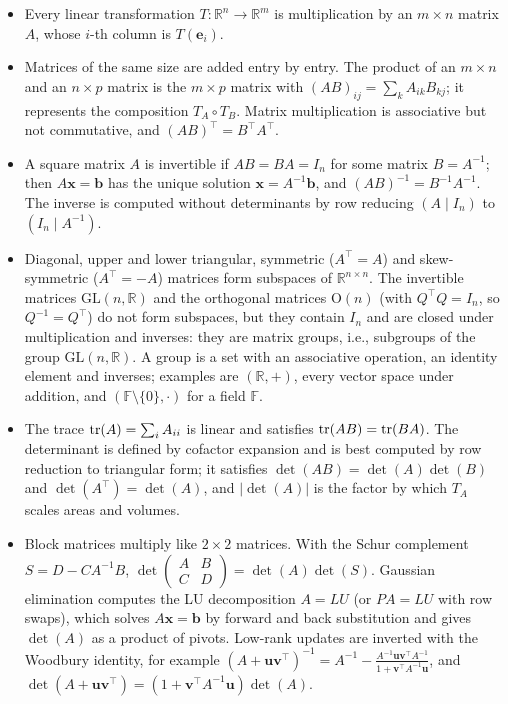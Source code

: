 \begin{itemize}[leftmargin=*]
	\item Every linear transformation $T: \mathbb{R}^n \to \mathbb{R}^m$ is multiplication by an $m \times n$ matrix $A$, whose $i$-th column is $T(\mathbf{e}_i)$.
	\item Matrices of the same size are added entry by entry. The product of an $m \times n$ and an $n \times p$ matrix is the $m \times p$ matrix with $(AB)_{ij} = \sum_k A_{ik} B_{kj}$; it represents the composition $T_A \circ T_B$. Matrix multiplication is associative but not commutative, and $(AB)^\top = B^\top A^\top$.
	\item A square matrix $A$ is invertible if $AB = BA = I_n$ for some matrix $B = A^{-1}$; then $A\mathbf{x} = \mathbf{b}$ has the unique solution $\mathbf{x} = A^{-1}\mathbf{b}$, and $(AB)^{-1} = B^{-1}A^{-1}$. The inverse is computed without determinants by row reducing $(A \mid I_n)$ to $(I_n \mid A^{-1})$.
	\item Diagonal, upper and lower triangular, symmetric ($A^\top = A$) and skew-symmetric ($A^\top = -A$) matrices form subspaces of $\mathbb{R}^{n \times n}$. The invertible matrices $\mathrm{GL}(n, \mathbb{R})$ and the orthogonal matrices $\mathrm{O}(n)$ (with $Q^\top Q = I_n$, so $Q^{-1} = Q^\top$) do not form subspaces, but they contain $I_n$ and are closed under multiplication and inverses: they are matrix groups, i.e., subgroups of the group $\mathrm{GL}(n, \mathbb{R})$. A group is a set with an associative operation, an identity element and inverses; examples are $(\mathbb{R}, +)$, every vector space under addition, and $(\mathbb{F} \setminus \{0\}, \cdot)$ for a field $\mathbb{F}$.
	\item The trace $\operatorname{tr}(A) = \sum_i A_{ii}$ is linear and satisfies $\operatorname{tr}(AB) = \operatorname{tr}(BA)$. The determinant is defined by cofactor expansion and is best computed by row reduction to triangular form; it satisfies $\det(AB) = \det(A)\det(B)$ and $\det(A^\top) = \det(A)$, and $|\det(A)|$ is the factor by which $T_A$ scales areas and volumes.
	\item Block matrices multiply like $2 \times 2$ matrices. With the Schur complement $S = D - CA^{-1}B$, $\det\begin{pmatrix} A & B \\ C & D \end{pmatrix} = \det(A)\det(S)$. Gaussian elimination computes the LU decomposition $A = LU$ (or $PA = LU$ with row swaps), which solves $A\mathbf{x} = \mathbf{b}$ by forward and back substitution and gives $\det(A)$ as a product of pivots. Low-rank updates are inverted with the Woodbury identity, for example $(A + \mathbf{u}\mathbf{v}^\top)^{-1} = A^{-1} - \frac{A^{-1}\mathbf{u}\mathbf{v}^\top A^{-1}}{1 + \mathbf{v}^\top A^{-1}\mathbf{u}}$, and $\det(A + \mathbf{u}\mathbf{v}^\top) = (1 + \mathbf{v}^\top A^{-1}\mathbf{u})\det(A)$.

\end{itemize}
